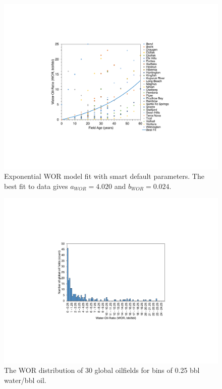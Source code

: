 \documentclass[11pt]{report}
\begin{document}
\begin{figure}
\includegraphics[width=1\columnwidth]{images/WOR_plot.pdf}
\caption{Exponential WOR model fit with smart default parameters. The best fit to data gives $a_{WOR} = 4.020$ and $b_{WOR} = 0.024$.}
\label{fig:exponenital_fit_WOR}
\end{figure}

\begin{figure}
\includegraphics[width=1\columnwidth]{images/WOR_hist.pdf}
\caption{The WOR distribution of 30 global oilfields for bins of 0.25 bbl water/bbl oil.}
\label{fig:WOR_hist}
\end{figure}
\end{document}
